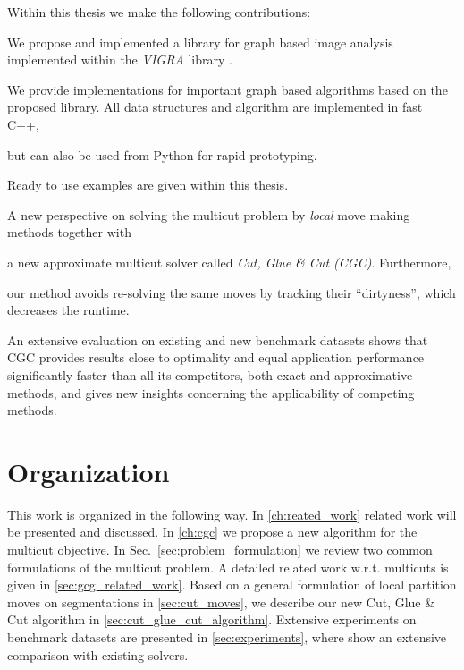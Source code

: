 Within this thesis we make the following contributions:

\begin{inparaenum}[(i)]
    \item 
    We propose and implemented a library for graph based image analysis 
        implemented within the \emph{VIGRA} library \cite{koethe_2000_phd_thesis,software_vigra}. 
    \item 
        We provide implementations for important graph based algorithms based on the proposed library.
        All data structures and algorithm are implemented in fast C++,
    \item but can also be used from Python for rapid prototyping.
    \item Ready to use examples are given within this thesis.




    \item
      A new perspective on solving the multicut problem by
      \emph{local} move making methods together with
      \item
      a new approximate multicut solver called
      \emph{Cut, Glue \& Cut (CGC)}. Furthermore,
      \item our method avoids re-solving the same moves
      by tracking their ``dirtyness'', which decreases the runtime. 
      \item
      An extensive evaluation on existing and new benchmark datasets shows
      that CGC provides results close to optimality
      and equal application performance significantly faster than all its
      competitors, both exact
      and approximative methods, and gives new insights concerning the applicability
      of competing methods.
\end{inparaenum}




\section{Organization}

This work is organized in the following way.
In \cref{ch:reated_work} related work will be presented and  discussed.
In \cref{ch:cgc} we propose a new algorithm for the multicut objective.
In Sec.~\ref{sec:problem_formulation} we review two common formulations
of the multicut problem. 
A detailed related work w.r.t. multicuts is given in \cref{sec:gcg_related_work}.
Based on a general formulation of local partition moves on segmentations in
\cref{sec:cut_moves},
we describe our new Cut, Glue \& Cut algorithm
in \cref{sec:cut_glue_cut_algorithm}. Extensive experiments
on benchmark datasets are presented in \cref{sec:experiments},
where show an extensive comparison  with existing solvers.

